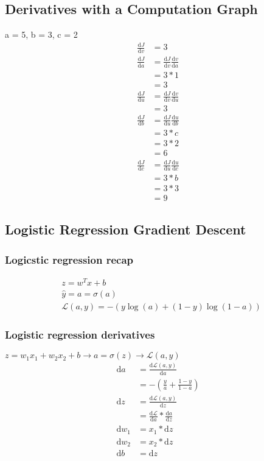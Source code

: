\subsection{Derivatives with a Computation Graph}
a = 5, b = 3, c = 2
\begin{align}
	\frac{\mathrm{d}J}{\mathrm{d}v} &= 3 \\
	\frac{\mathrm{d}J}{\mathrm{d}a} &= \frac{\mathrm{d}J}{\mathrm{d}v} \frac{\mathrm{d}v}{\mathrm{d}a} \\
	&= 3 * 1 \\
	&= 3 \\
	\frac{\mathrm{d}J}{\mathrm{d}u} &= \frac{\mathrm{d}J}{\mathrm{d}v} \frac{\mathrm{d}v}{\mathrm{d}u} \\ 
	&= 3 \\
	\frac{\mathrm{d}J}{\mathrm{d}b} &= \frac{\mathrm{d}J}{\mathrm{d}u} \frac{\mathrm{d}u}{\mathrm{d}b} \\
	&= 3 * c \\
	&= 3 * 2 \\
	&= 6 \\
	\frac{\mathrm{d}J}{\mathrm{d}c} &= \frac{\mathrm{d}J}{\mathrm{d}u} \frac{\mathrm{d}u}{\mathrm{d}c} \\
	&= 3 * b \\
	&= 3 * 3 \\
	&= 9
\end{align}


\subsection{Logistic Regression Gradient Descent}
\subsubsection{Logicstic regression recap}
\begin{align}
	&z = w^Tx + b \\
	&\hat{y} = a = \sigma(a) \\
	&\mathcal{L}(a, y) = -(y\log(a) + (1-y)\log(1 - a))
\end{align}

\subsubsection{Logistic regression derivatives}
$z = w_1 x_1 + w_2 x_2 + b \rightarrow a = \sigma(z) \rightarrow \mathcal L (a, y)$
\begin{align}
	\mathrm{d} a &= \frac{\mathrm{d} \mathcal{L}(a, y)} {\mathrm{d} a} \\
					&= -(\frac{y}{a} + \frac{1 - y}{1 - a}) \\
	\mathrm{d} z &= \frac{\mathrm{d} \mathcal{L}(a, y)} {\mathrm{d} z} \\
			      &= \frac{\mathrm{d} \mathcal{L}} {\mathrm{d} a} * \frac{\mathrm{d} a} {\mathrm{d} z} \\
	\mathrm{d} w_1 &= x_1 * \mathrm{d} z \\
	\mathrm{d} w_2 &= x_2 * \mathrm{d} z \\
	\mathrm{d} b &= \mathrm{d} z
\end{align}



